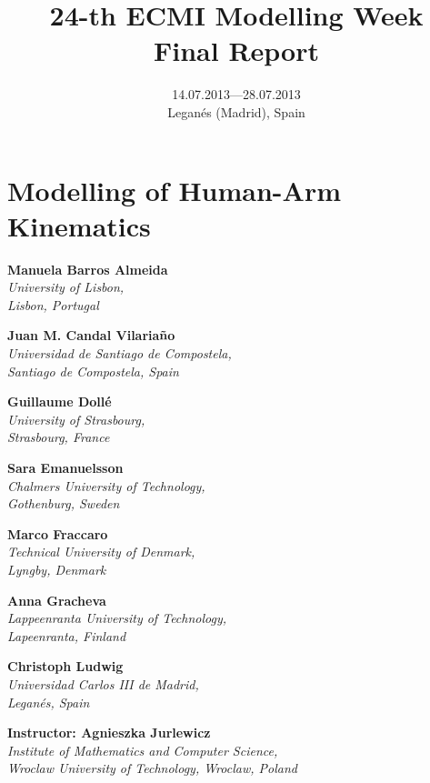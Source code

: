 \documentclass[a4paper,11pt,twoside]{report}
\title{24-th ECMI Modelling Week \\
Final Report}
\author{}
\date{14.07.2013---28.07.2013\\
Legan\'{e}s (Madrid), Spain}
\newcommand{\modchapter}{\chapter}
\newcommand{\shortname}{}
\begin{document}
\pagestyle{myheadings}

\setcounter{secnumdepth}{1}

\modchapter{Modelling of Human-Arm Kinematics}
\renewcommand{\shortname}{Human-Arm Kinematics}

\begin{center}

\textbf{Manuela Barros Almeida}\\
\textit{University of Lisbon,\\
Lisbon, Portugal}

\textbf{Juan M. Candal Vilaria\~{n}o}\\
\textit{Universidad de Santiago de Compostela,\\
Santiago de Compostela, Spain}

\textbf{Guillaume Doll\'{e}}\\
\textit{University of Strasbourg,\\
Strasbourg, France}

\textbf{Sara Emanuelsson}\\
\textit{Chalmers University of Technology,\\
Gothenburg, Sweden}

\textbf{Marco Fraccaro}\\
\textit{Technical University of Denmark,\\
Lyngby, Denmark}

\textbf{Anna Gracheva}\\
\textit{Lappeenranta University of Technology,\\
 Lapeenranta, Finland}

\textbf{Christoph Ludwig}\\
\textit{Universidad Carlos III de Madrid,\\
Legan\'{e}s, Spain}

\vspace{10mm}

\textbf{Instructor: Agnieszka Jurlewicz}\\
\textit{Institute of Mathematics and Computer Science, \\
Wroclaw University of Technology, Wroclaw, Poland}

\end{center}



\nocite{*}


\end{document}
